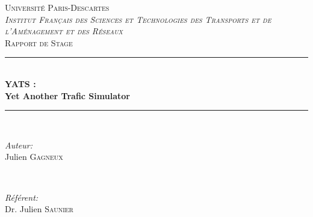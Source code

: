 \documentclass[a4paper,11pt]{article}
\author{Gagneux Julien}
\begin{document}
\begin{titlepage}

\newcommand{\HRule}{\rule{\linewidth}{0.5mm}} %

\center %


\textsc{\LARGE Université Paris-Descartes }\\[1.5cm] %
\textsc{\Large \textit{Institut Français des Sciences et Technologies des Transports et de l'Aménagement et des Réseaux}}\\[0.5cm] %
\textsc{\large Rapport de Stage}\\[0.5cm] %


\HRule \\[0.4cm]
{ \huge \bfseries YATS :\\
\vspace{0.5cm}
Yet Another Trafic Simulator}\\[0.4cm] %
\HRule \\[4cm]
 

\begin{minipage}{0.4\textwidth}
\begin{flushleft} \large
\emph{Auteur:}\\
Julien \textsc{Gagneux} %
\end{flushleft}
\end{minipage}
~
\begin{minipage}{0.4\textwidth}
\begin{flushright} \large
\emph{Référent:} \\
Dr. Julien \textsc{Saunier} %
\end{flushright}
\end{minipage}\\[4cm]


\end{titlepage}
\end{document}
